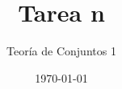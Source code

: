 \documentclass{article}
\title{Tarea n}
\author{Teoría de Conjuntos 1}
\date{\today}
\begin{document}
\maketitle

\kant
\end{document}
